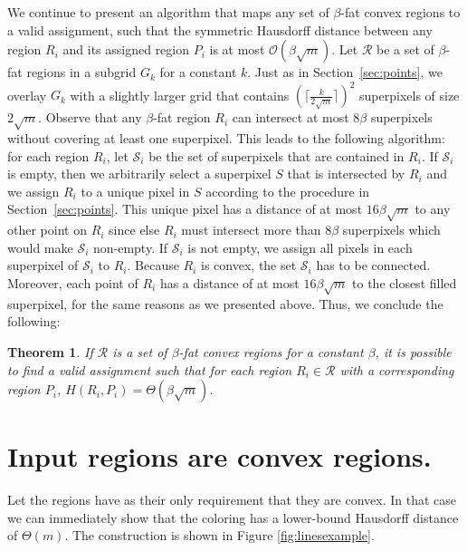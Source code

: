 \documentclass[a4paper, 11pt]{article}
\newtheorem{theorem}{Theorem}
\begin{document}
We continue to present an algorithm that maps any set of $\beta$-fat convex regions to a valid assignment, such that the symmetric Hausdorff distance between any region $R_i$ and its assigned region $P_i$ is at most $\mathcal{O}(\beta \sqrt{m})$. Let $\mathcal{R}$ be a set of $\beta$-fat regions in a subgrid $G_k$ for a constant $k$. Just as in Section~\ref{sec:points}, we overlay $G_k$ with a slightly larger grid that contains $(\lceil \frac{k}{2\sqrt{m}} \rceil)^2$ superpixels of size $2\sqrt{m}$. Observe that any $\beta$-fat region $R_i$ can intersect at most $8\beta$ superpixels without covering at least one superpixel. This leads to the following algorithm: for each region $R_i$, let $\mathcal{S}_i$ be the set of superpixels that are contained in $R_i$. If $\mathcal{S}_i$ is empty, then we arbitrarily select a superpixel $S$ that is intersected by $R_i$ and we assign $R_i$ to a unique pixel in $S$ according to the procedure in Section~\ref{sec:points}. This unique pixel has a distance of at most $16\beta \sqrt{m}$ to any other point on $R_i$ since else $R_i$ must intersect more than $8\beta$ superpixels which would make $\mathcal{S}_i$ non-empty. If $\mathcal{S}_i$ is not empty, we assign all pixels in each superpixel of $\mathcal{S}_i$ to $R_i$. Because $R_i$ is convex, the set $\mathcal{S}_i$ has to be connected. Moreover, each point of $R_i$ has a distance of at most $16\beta \sqrt{m}$ to the closest filled superpixel, for the same reasons as we presented above. Thus, we conclude the following:


\begin{theorem}
If $\mathcal{R}$ is a set of $\beta$-fat convex regions for a constant $\beta$, it is possible to find a valid assignment such that for each region $R_i \in \mathcal{R}$ with a corresponding region $P_i$, $H(R_i, P_i) = \Theta(\beta\sqrt{m})$.
\end{theorem}


\section{Input regions are convex regions.}\label{sec:convex}
Let the regions have as their only requirement that they are convex. In that case we can immediately show that the coloring has a lower-bound Hausdorff distance of $\Theta(m)$. The construction is shown in Figure \ref{fig:linesexample}.
\end{document}
